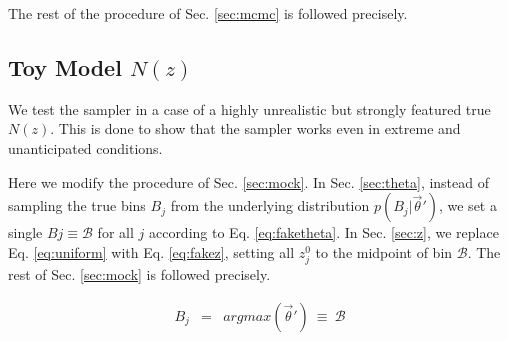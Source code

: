 \documentclass[preprint]{aastex}
\begin{document}
The rest of the procedure of Sec. \ref{sec:mcmc} is followed precisely.

%
%
%

\clearpage
\subsection{Toy Model $N(z)$}
\label{sec:fake}

We test the sampler in a case of a highly unrealistic but strongly featured true $N(z)$.  This is done to show that the sampler works even in extreme and unanticipated conditions.

Here we modify the procedure of Sec. \ref{sec:mock}.  In Sec. \ref{sec:theta}, instead of sampling the true bins $B_{j}$ from the underlying distribution $p(B_{j}|\vec{\theta}')$, we set a single $B{j}\equiv\mathcal{B}$ for all $j$ according to Eq. \ref{eq:faketheta}.  In Sec. \ref{sec:z}, we replace Eq. \ref{eq:uniform} with Eq. \ref{eq:fakez}, setting all $z^{0}_{j}$ to the midpoint of bin $\mathcal{B}$.  The rest of Sec. \ref{sec:mock} is followed precisely.

\begin{eqnarray}
\label{eq:faketheta}
B_{j} &=& argmax(\vec{\theta}')\ \equiv\ \mathcal{B}
\end{eqnarray}
\end{document}
